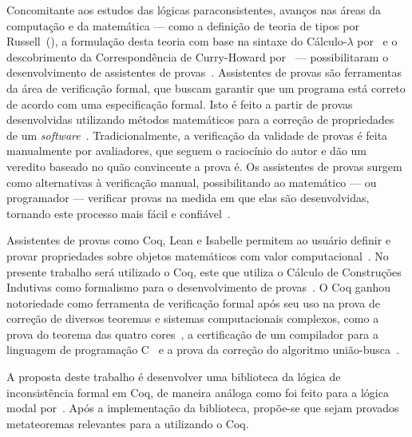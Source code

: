 Concomitante aos estudos das lógicas paraconsistentes, avanços nas áreas da computação e da matemática {---} como a definição de teoria de tipos por Russell~(\citeyear{russell1903principles,Russell1908-RUSMLA}), a formulação desta teoria com base na sintaxe do Cálculo-$\lambda$ por~ e o descobrimento da Correspondência de Curry-Howard por~ {---} possibilitaram o desenvolvimento de assistentes de provas~\cite{harrison2014history}. Assistentes de provas são ferramentas da área de verificação formal, que buscam garantir que um programa está correto de acordo com uma especificação formal. Isto é feito a partir de provas desenvolvidas utilizando métodos matemáticos para a correção de propriedades de um \textit{software}~\cite{Chlipala_2013}. Tradicionalmente, a verificação da validade de provas é feita manualmente por avaliadores, que seguem o raciocínio do autor e dão um veredito baseado no quão convincente a prova é. Os assistentes de provas surgem como alternativas à verificação manual, possibilitando ao matemático {---} ou programador {---} verificar provas na medida em que elas são desenvolvidas, tornando este processo mais fácil e confiável~\cite{paulinmohring:hal-01094195}.

Assistentes de provas como Coq, Lean e Isabelle permitem ao usuário definir e provar propriedades sobre objetos matemáticos com valor computacional~\cite{geuvers2009proof}. No presente trabalho será utilizado o Coq, este que utiliza o Cálculo de Construções Indutivas como formalismo para o desenvolvimento de provas~\cite{TEAM_2024}. O Coq ganhou notoriedade como ferramenta de verificação formal após seu uso na prova de correção de diversos teoremas e sistemas computacionais complexos, como a prova do teorema das quatro cores~\cite{geuvers2009proof}, a certificação de um compilador para a linguagem de programação C~\cite{leroy2021compcert} e a prova da correção do algoritmo união-busca~\cite{union-find}.

A proposta deste trabalho é desenvolver uma biblioteca da lógica de inconsistência formal \lfium{} em Coq, de maneira análoga como foi feito para a lógica modal por~. Após a implementação da biblioteca, propõe-se que sejam provados metateoremas relevantes para a \lfium{} utilizando o Coq.



